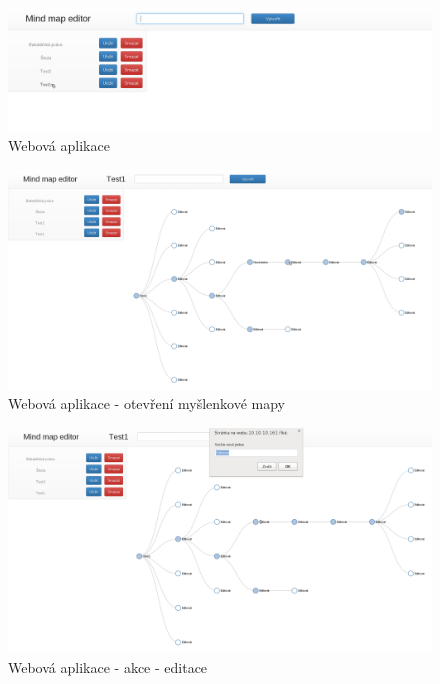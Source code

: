 \begin{figure}
\begin{centering}
\includegraphics[width	=1\textwidth]{obrazky/mindmap1}
\par\end{centering}
\caption{Webová aplikace\label{fig:midnmap1}}
\end{figure}

\begin{figure}
\begin{centering}
\includegraphics[width	=1\textwidth]{obrazky/mindmap2}
\par\end{centering}
\caption{Webová aplikace - otevření myšlenkové mapy\label{fig:midnmap2}}
\end{figure}

\begin{figure}
\begin{centering}
\includegraphics[width	=1\textwidth]{obrazky/mindmap3}
\par\end{centering}
\caption{Webová aplikace - akce - editace\label{fig:midnmap3}}
\end{figure}

